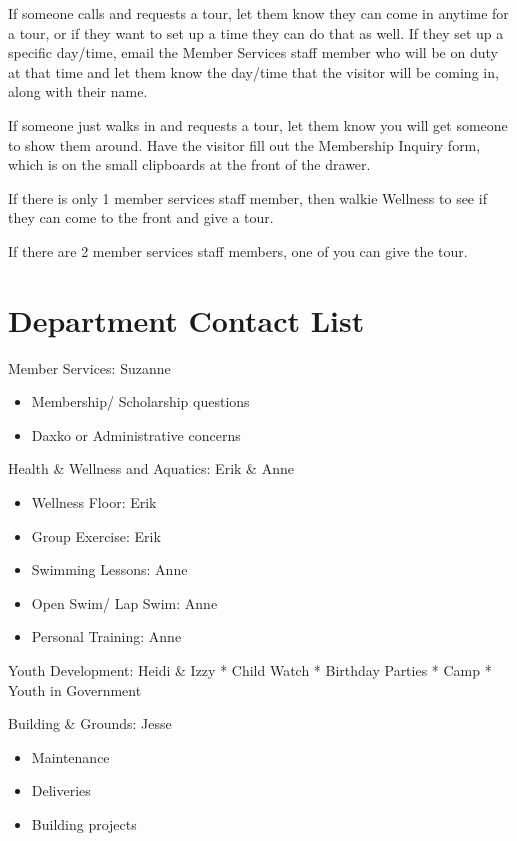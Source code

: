 \documentclass[
]{report}
\providecommand{\tightlist}{%
  \setlength{\itemsep}{0pt}\setlength{\parskip}{0pt}}\usepackage{longtable,booktabs,array}
\begin{document}
If someone calls and requests a tour, let them know they can come in
anytime for a tour, or if they want to set up a time they can do that as
well. If they set up a specific day/time, email the Member Services
staff member who will be on duty at that time and let them know the
day/time that the visitor will be coming in, along with their name.

If someone just walks in and requests a tour, let them know you will get
someone to show them around. Have the visitor fill out the Membership
Inquiry form, which is on the small clipboards at the front of the
drawer.

If there is only 1 member services staff member, then walkie Wellness to
see if they can come to the front and give a tour.

If there are 2 member services staff members, one of you can give the
tour.

\hypertarget{department-contact-list}{%
\section{Department Contact List}\label{department-contact-list}}

Member Services: Suzanne

\begin{itemize}
\tightlist
\item
  Membership/ Scholarship questions
\item
  Daxko or Administrative concerns
\end{itemize}

Health \& Wellness and Aquatics: Erik \& Anne

\begin{itemize}
\tightlist
\item
  Wellness Floor: Erik
\item
  Group Exercise: Erik
\item
  Swimming Lessons: Anne
\item
  Open Swim/ Lap Swim: Anne
\item
  Personal Training: Anne
\end{itemize}

Youth Development: Heidi \& Izzy * Child Watch * Birthday Parties * Camp
* Youth in Government

Building \& Grounds: Jesse

\begin{itemize}
\tightlist
\item
  Maintenance
\item
  Deliveries
\item
  Building projects
\end{itemize}
\end{document}
